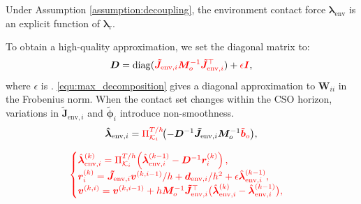 \begin{lemma}
Under Assumption \ref{assumption:decoupling}, the environment contact force $\boldsymbol{\lambda}_{\text{env}}$ is an explicit function of $\boldsymbol{\lambda}_{\text{r}}$.
\end{lemma}
To obtain a high-quality approximation, we set the diagonal matrix to:
\begin{equation}\label{equ:max_decomposition}
\boldsymbol{D} = \operatorname{diag}(\textcolor{red}{\boldsymbol{\tilde{J}}_{\text{env},i}\boldsymbol{M}_o^{-1}\boldsymbol{\tilde{J}}_{\text{env},i}^{\top}}) + \textcolor{red}{\epsilon \boldsymbol{I}},
\end{equation}
\noindent where $\epsilon$ is . \eqref{equ:max_decomposition} gives a diagonal approximation to $\boldsymbol{W}_{ii}$ in the Frobenius norm. When the contact set changes within the CSO horizon, variations in $\boldsymbol{\tilde{J}}_{\text{env},i}$ and $\boldsymbol{\tilde{\phi}}_i$ introduce non-smoothness.
\begin{equation}
\boldsymbol{\hat{\lambda}}_{\text{env}, i}
=
\textcolor{red}{\Pi^{T/h}_{\mathcal{K}_i}}
\!\bigl(
-
\boldsymbol{D}^{-1}
\boldsymbol{\tilde{J}}_{\text{env},i} \boldsymbol{M}_o^{-1}\textcolor{red}{\boldsymbol{\tilde{b}}_o}
\bigr),
\label{eq:quasi-closed_form_solution}
\end{equation}

\begingroup
\setlength{\abovedisplayskip}{3pt}
\setlength{\abovedisplayshortskip}{3pt}
\begin{equation}
\textcolor{red}{
\begin{cases}
\hat{\boldsymbol{\lambda}}^{(k)}_{\mathrm{env},i}
=\Pi^{T/h}_{\mathcal{K}_i}\!\left(
\hat{\boldsymbol{\lambda}}^{(k-1)}_{\mathrm{env},i}-\boldsymbol{D}^{-1}\boldsymbol{r}^{(k)}_{i}\right),\\
\boldsymbol{r}^{(k)}_{i}
=\boldsymbol{\tilde{J}}_{\mathrm{env},i}\boldsymbol{v}^{(k,i-1)}/h+\boldsymbol{d}_{\mathrm{env},i}/h^2+\epsilon\hat{\boldsymbol{\lambda}}^{(k-1)}_{\mathrm{env},i},\\
\boldsymbol{v}^{(k,i)}
=\boldsymbol{v}^{(k,i-1)}+h\boldsymbol{M}_o^{-1}\boldsymbol{\tilde{J}}_{\mathrm{env},i}^{\top}\bigl(\hat{\boldsymbol{\lambda}}^{(k)}_{\mathrm{env},i}-\hat{\boldsymbol{\lambda}}^{(k-1)}_{\mathrm{env},i}\bigr),
\end{cases}}
\label{eq:scm_single_step_projection}
\end{equation}
\endgroup

